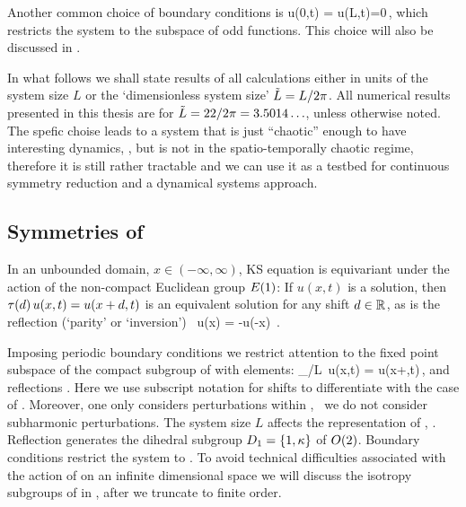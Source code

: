 Another common choice of boundary conditions is 
\beq
  u(0,t) = u(L,t)=0\,,
 \label{eq:KSodd}
\eeq
which restricts the system to the subspace of odd functions. This choice will also be discussed
in .

In what follows
we shall state results of all calculations either in units of the system size $L$
or the `dimensionless system size' $\tilde{L}=L/2\pi$. 
All numerical results presented in this thesis
are for $\tilde{L}=22/2\pi = 3.5014\ldots$, unless otherwise
noted. The spefic choise leads to a system that is just ``chaotic'' enough 
to have interesting dynamics, \cf {}, but is not in the spatio-temporally chaotic
regime, therefore it is still rather tractable and we can use it as a testbed for
continuous symmetry reduction and a dynamical systems approach.


\subsection{Symmetries of \KSe}
\label{sec:KSeSymm}

In an unbounded domain, $x\in(-\infty,\infty)$, KS equation is equivariant
under the action of the non-compact Euclidean group $E(1)$:
If $u(x,t)$ is a solution, then
$\tau({d})\, u(x,t) = u(x+d,t)$
is an equivalent solution for any shift
$d\in\mathbb{R}^{}$, as is the reflection (`parity' or `inversion')
\beq
    \Refl \, u(x) = -u(-x)
\,.

Imposing periodic boundary conditions we restrict attention to the fixed
point subspace of the compact subgroup  of  with elements:
\beq
	\Shift_{\shift/L}\, u(x,t) = u(x+\shift,t)\,,\qquad \shift\in\left[-L/2,L/2\right]	
\eeq
and reflections . Here we use subscript notation for shifts to differentiate
with the case of .
Moreover, one only considers perturbations within , \ie\ we do not
consider subharmonic perturbations. The system size $L$ affects the representation
of , \cf {}. 
Reflection generates the dihedral subgroup $D_{1} = \{1, \kappa\}$
of $O(2)$. Boundary conditions  restrict the system to . 
To avoid technical difficulties associated with the action of  on an infinite dimensional
space we will discuss the isotropy subgroups of  in , 
after we truncate  to finite order.


